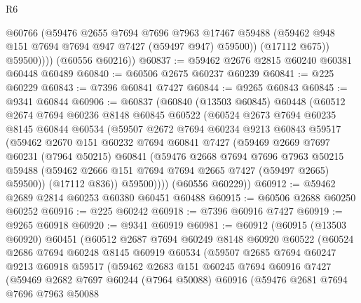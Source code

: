 \begin{lexlean}{R6}
\begin{coremodule}
                @60766
                (@59476
                  @2655
                  @7694
                  @7696
                  @7963
                  @17467
                  @59488
                  (@59462 @948 @151 @7694 @7694 @947 @7427 (@59497 @947) @59500))
                (@17112 @675))
              @59500))))
      (@60556 @60216))
@60837 := @59462 @2676 @2815 @60240 @60381 @60448 @60489
@60840 := @60506 @2675 @60237 @60239
@60841 := @225 @60229
@60843 := @7396 @60841 @7427
@60844 := @9265 @60843
@60845 := @9341 @60844
@60906 := @60837
    (@60840
      (@13503 @60845)
      @60448
      (@60512
        @2674
        @7694
        @60236
        @8148
        @60845
        @60522
        (@60524
          @2673
          @7694
          @60235
          @8145
          @60844
          @60534
          (@59507
            @2672
            @7694
            @60234
            @9213
            @60843
            @59517
            (@59462
              @2670
              @151
              @60232
              @7694
              @60841
              @7427
              (@59469
                @2669
                @7697
                @60231
                (@7964 @50215)
                @60841
                (@59476
                  @2668
                  @7694
                  @7696
                  @7963
                  @50215
                  @59488
                  (@59462 @2666 @151 @7694 @7694 @2665 @7427 (@59497 @2665) @59500))
                (@17112 @836))
              @59500))))
      (@60556 @60229))
@60912 := @59462 @2689 @2814 @60253 @60380 @60451 @60488
@60915 := @60506 @2688 @60250 @60252
@60916 := @225 @60242
@60918 := @7396 @60916 @7427
@60919 := @9265 @60918
@60920 := @9341 @60919
@60981 := @60912
    (@60915
      (@13503 @60920)
      @60451
      (@60512
        @2687
        @7694
        @60249
        @8148
        @60920
        @60522
        (@60524
          @2686
          @7694
          @60248
          @8145
          @60919
          @60534
          (@59507
            @2685
            @7694
            @60247
            @9213
            @60918
            @59517
            (@59462
              @2683
              @151
              @60245
              @7694
              @60916
              @7427
              (@59469
                @2682
                @7697
                @60244
                (@7964 @50088)
                @60916
                (@59476
                  @2681
                  @7694
                  @7696
                  @7963
                  @50088

\end{coremodule}
\end{lexlean}
